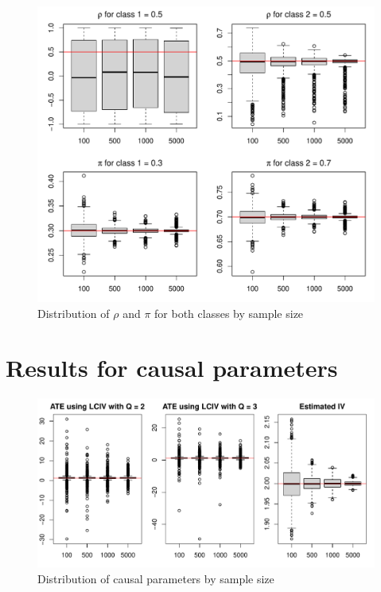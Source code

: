 \documentclass[12pt]{article}\usepackage[]{graphicx}\usepackage[]{xcolor}
\makeatletter
\def\maxwidth{ %
  \ifdim\Gin@nat@width>\linewidth
    \linewidth
  \else
    \Gin@nat@width
  \fi
}
\newenvironment{knitrout}{}{} %
\makeatother
\begin{document}
\begin{figure}[H]
 \caption{Distribution of $\rho$  and $\pi$ for both classes by sample size}
 \centering
\begin{knitrout}
\color{fgcolor}
\includegraphics[width=\maxwidth]{figure/fig2c-1} 
\end{knitrout}
\end{figure}

\section{Results for causal parameters}

\begin{figure}[H]
 \caption{Distribution of causal parameters by sample size}
 \centering
\begin{knitrout}
\color{fgcolor}
\includegraphics[width=\maxwidth]{figure/fig3c-1} 
\end{knitrout}
\end{figure}
\end{document}
